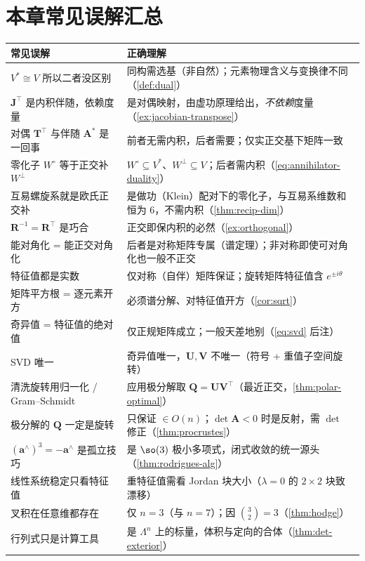 \section*{本章常见误解汇总}
\begin{table}[H]\centering\small
\begin{tabular}{p{} p{}}
\toprule
\textbf{常见误解} & \textbf{正确理解} \\
\midrule
$V^*\cong V$ 所以二者没区别 & 同构需选基（非自然）；元素物理含义与变换律不同（\cref{def:dual}）\\
$\mathbf{J}^\top$ 是内积伴随，依赖度量 & 是对偶映射，由虚功原理给出，\emph{不依赖}度量（\cref{ex:jacobian-transpose}）\\
对偶 $\mathbf{T}^\top$ 与伴随 $\mathbf{A}^*$ 是一回事 & 前者无需内积，后者需要；仅实正交基下矩阵一致 \\
零化子 $W^\circ$ 等于正交补 $W^\perp$ & $W^\circ\subseteq V^*$、$W^\perp\subseteq V$；后者需内积（\cref{eq:annihilator-duality}）\\
互易螺旋系就是欧氏正交补 & 是做功（Klein）配对下的零化子，与互易系维数和恒为 $6$，不需内积（\cref{thm:recip-dim}）\\
$\mathbf{R}^{-1}=\mathbf{R}^\top$ 是巧合 & 正交即保内积的必然（\cref{ex:orthogonal}）\\
能对角化 = 能正交对角化 & 后者是对称矩阵专属（谱定理）；非对称即使可对角化也一般不正交 \\
特征值都是实数 & 仅对称（自伴）矩阵保证；旋转矩阵特征值含 $e^{\pm i\theta}$ \\
矩阵平方根 = 逐元素开方 & 必须谱分解、对特征值开方（\cref{cor:sqrt}）\\
奇异值 = 特征值的绝对值 & 仅正规矩阵成立；一般天差地别（\cref{eq:svd} 后注）\\
SVD 唯一 & 奇异值唯一，$\mathbf{U},\mathbf{V}$ 不唯一（符号 + 重值子空间旋转）\\
清洗旋转用归一化 / Gram--Schmidt & 应用极分解取 $\mathbf{Q}=\mathbf{U}\mathbf{V}^\top$（最近正交，\cref{thm:polar-optimal}）\\
极分解的 $\mathbf{Q}$ 一定是旋转 & 只保证 $\in O(n)$；$\det\mathbf{A}<0$ 时是反射，需 $\det$ 修正（\cref{thm:procrustes}）\\
$(\mathbf{a}^\wedge)^3=-\mathbf{a}^\wedge$ 是孤立技巧 & 是 $\so(3)$ 极小多项式，闭式收敛的统一源头（\cref{thm:rodrigues-alg}）\\
线性系统稳定只看特征值 & 重特征值需看 Jordan 块大小（$\lambda=0$ 的 $2\times2$ 块致漂移）\\
叉积在任意维都存在 & 仅 $n=3$（与 $n=7$）；因 $\binom{3}{2}=3$（\cref{thm:hodge}）\\
行列式只是计算工具 & 是 $\Lambda^n$ 上的标量，体积与定向的合体（\cref{thm:det-exterior}）\\
\bottomrule
\end{tabular}
\end{table}

